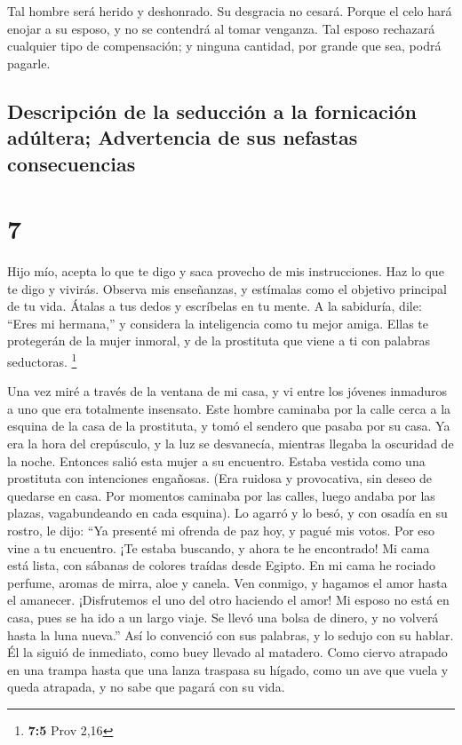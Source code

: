  Tal hombre será herido y deshonrado. Su desgracia no
cesará.  Porque el celo hará enojar a su esposo, y no se
contendrá al tomar venganza.  Tal esposo rechazará
cualquier tipo de compensación; y ninguna cantidad, por grande que sea,
podrá pagarle.

\hypertarget{descripciuxf3n-de-la-seducciuxf3n-a-la-fornicaciuxf3n-aduxfaltera-advertencia-de-sus-nefastas-consecuencias}{%
\subsection{Descripción de la seducción a la fornicación adúltera;
Advertencia de sus nefastas
consecuencias}\label{descripciuxf3n-de-la-seducciuxf3n-a-la-fornicaciuxf3n-aduxfaltera-advertencia-de-sus-nefastas-consecuencias}}

\hypertarget{section-6}{%
\section{7}\label{section-6}}

 Hijo mío, acepta lo que te digo y saca provecho de mis
instrucciones.  Haz lo que te digo y vivirás. Observa mis
enseñanzas, y estímalas como el objetivo principal de tu vida.
 Átalas a tus dedos y escríbelas en tu mente.  A
la sabiduría, dile: ``Eres mi hermana,'' y considera la inteligencia
como tu mejor amiga.  Ellas te protegerán de la mujer
inmoral, y de la prostituta que viene a ti con palabras seductoras.
\footnote{\textbf{7:5} Prov 2,16}

 Una vez miré a través de la ventana de mi casa,
 y vi entre los jóvenes inmaduros a uno que era totalmente
insensato.  Este hombre caminaba por la calle cerca a la
esquina de la casa de la prostituta, y tomó el sendero que pasaba por su
casa.  Ya era la hora del crepúsculo, y la luz se
desvanecía, mientras llegaba la oscuridad de la noche. 
Entonces salió esta mujer a su encuentro. Estaba vestida como una
prostituta con intenciones engañosas.  (Era ruidosa y
provocativa, sin deseo de quedarse en casa.  Por momentos
caminaba por las calles, luego andaba por las plazas, vagabundeando en
cada esquina).  Lo agarró y lo besó, y con osadía en su
rostro, le dijo:  ``Ya presenté mi ofrenda de paz hoy, y
pagué mis votos.  Por eso vine a tu encuentro. ¡Te estaba
buscando, y ahora te he encontrado!  Mi cama está lista,
con sábanas de colores traídas desde Egipto.  En mi cama he
rociado perfume, aromas de mirra, aloe y canela.  Ven
conmigo, y hagamos el amor hasta el amanecer. ¡Disfrutemos el uno del
otro haciendo el amor!  Mi esposo no está en casa, pues se
ha ido a un largo viaje.  Se llevó una bolsa de dinero, y
no volverá hasta la luna nueva.''  Así lo convenció con sus
palabras, y lo sedujo con su hablar.  Él la siguió de
inmediato, como buey llevado al matadero. Como ciervo atrapado en una
trampa  hasta que una lanza traspasa su hígado, como un ave
que vuela y queda atrapada, y no sabe que pagará con su vida.


